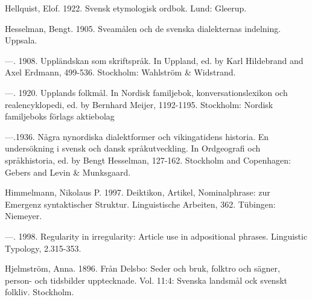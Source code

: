 \begin{styleBodytextC}
Hellquist, Elof. 1922. Svensk etymologisk ordbok. Lund: Gleerup.

\end{styleBodytextC}

\begin{styleBodytextC}
Hesselman, Bengt. 1905. Sveamålen och de svenska dialekternas indelning. Uppsala.

\end{styleBodytextC}

\begin{styleBodytextC}
—. 1908. Uppländskan som skriftspråk. In Uppland, ed. by Karl Hildebrand and Axel Erdmann, 499-536. Stockholm: Wahlström \& Widstrand.

\end{styleBodytextC}

\begin{styleBodytextC}
—. 1920. Upplands folkmål. In Nordisk familjebok, konversationslexikon och realencyklopedi, ed. by Bernhard Meijer, 1192-1195. Stockholm: Nordisk familjeboks förlags aktiebolag 

\end{styleBodytextC}

\begin{styleBodytextC}
—.1936. Några nynordiska dialektformer och vikingatidens historia. En undersökning i svensk och dansk språkutveckling. In Ordgeografi och språkhistoria, ed. by Bengt Hesselman, 127-162. Stockholm and Copenhagen: Gebers and Levin \& Munksgaard. 

\end{styleBodytextC}

\begin{styleBodytextC}
Himmelmann, Nikolaus P. 1997. Deiktikon, Artikel, Nominalphrase: zur Emergenz syntaktischer Struktur. Linguistische Arbeiten, 362. Tübingen: Niemeyer.

\end{styleBodytextC}

\begin{styleBodytextC}
—. 1998. Regularity in irregularity: Article use in adpositional phrases. Linguistic Typology, 2.315-353.

\end{styleBodytextC}

\begin{styleBodytextC}
Hjelmström, Anna. 1896. Från Delsbo: Seder och bruk, folktro och sägner, person- och tidsbilder upptecknade. Vol. 11:4: Svenska landsmål ock svenskt folkliv. Stockholm.

\end{styleBodytextC}

